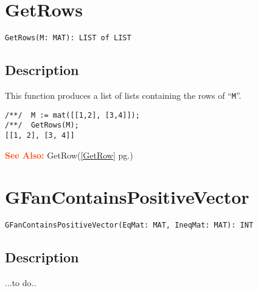 \documentclass[a4paper]{mybook}
\newenvironment{command}{}{} %
\newcommand\SeeAlso{\par\textcolor{OrangeRed}{\textbf{\large See Also: }}}
\begin{document}
\section{GetRows}
\label{GetRows}
\begin{command} %


\begin{Verbatim}[label=syntax, rulecolor=\color{MidnightBlue},
frame=single]
GetRows(M: MAT): LIST of LIST
\end{Verbatim}


\subsection*{Description}

This function produces a list of lists containing the rows of ``\verb&M&''.
\begin{Verbatim}[label=example, rulecolor=\color{PineGreen}, frame=single]
/**/  M := mat([[1,2], [3,4]]);
/**/  GetRows(M);
[[1, 2], [3, 4]]
\end{Verbatim}


\SeeAlso %
  GetRow(\ref{GetRow} pg.\pageref{GetRow})
\end{command} %

\section{GFanContainsPositiveVector}
\label{GFanContainsPositiveVector}
\begin{command} %


\begin{Verbatim}[label=syntax, rulecolor=\color{MidnightBlue},
frame=single]
GFanContainsPositiveVector(EqMat: MAT, IneqMat: MAT): INT
\end{Verbatim}


\subsection*{Description}

...to do..

\end{command} %
\end{document}
